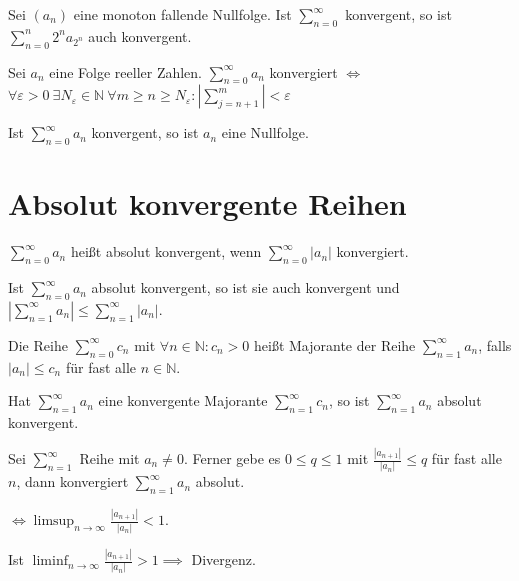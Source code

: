 \begin{theorem}
  Sei $(a_n)$ eine monoton fallende Nullfolge. Ist $\sum_{n=0}^{\infty}$ konvergent, so ist $\sum_{n=0}^n 2^n a_{2^n}$ auch konvergent.
\end{theorem}

\begin{theorem}
  Sei $a_n$ eine Folge reeller Zahlen. $\sum_{n=0}^{\infty} a_n$ konvergiert $\iff$ $\forall \varepsilon > 0\: \exists N_{\varepsilon} \in \mathbb{N}\: \forall m \ge n \ge N_{\varepsilon}: \left| \sum_{j=n+1}^m \right| < \varepsilon$
\end{theorem}

\begin{corollary}
  Ist $\sum_{n=0}^{\infty} a_n$ konvergent, so ist $a_n$ eine Nullfolge.
\end{corollary}

\section{Absolut konvergente Reihen}

\begin{definition}
  $\sum_{n=0}^{\infty} a_n$ heißt absolut konvergent, wenn $\sum_{n=0}^{\infty} |a_n|$ konvergiert.
\end{definition}

\begin{theorem}
  Ist $\sum_{n=0}^{\infty} a_n$ absolut konvergent, so ist sie auch konvergent und $\left| \sum_{n=1}^{\infty} a_n \right| \le \sum_{n=1}^{\infty} |a_n|$.
\end{theorem}

\begin{definition}[Majorante]
  Die Reihe $\sum_{n=0}^{\infty} c_n$ mit $\forall n \in \mathbb{N}: c_n > 0$ heißt Majorante der Reihe $\sum_{n=1}^{\infty} a_n$, falls $|a_n| \le c_n$ für fast alle $n \in \mathbb{N}$.
\end{definition}

\begin{theorem}[Majorantenkriterium]
  Hat $\sum_{n=1}^{\infty} a_n$ eine konvergente Majorante $\sum_{n=1}^{\infty} c_n$, so ist $\sum_{n=1}^{\infty} a_n$ absolut konvergent.
\end{theorem}

\begin{theorem}[Quotientenkriterium]
  Sei $\sum_{n=1}^{\infty}$ Reihe mit $a_n \ne 0$. Ferner gebe es $0 \le q \le 1$ mit $\frac{|a_{n+1}|}{|a_n|} \le q$ für fast alle $n$, dann konvergiert $\sum_{n=1}^{\infty} a_n$ absolut.
\end{theorem}

\begin{remark}
  $\iff \limsup_{n \to \infty} \frac{|a_{n+1}|}{|a_n|} < 1$.

  Ist $\liminf_{n \to \infty} \frac{|a_{n+1}|}{|a_n|} > 1 \implies$ Divergenz.
\end{remark}